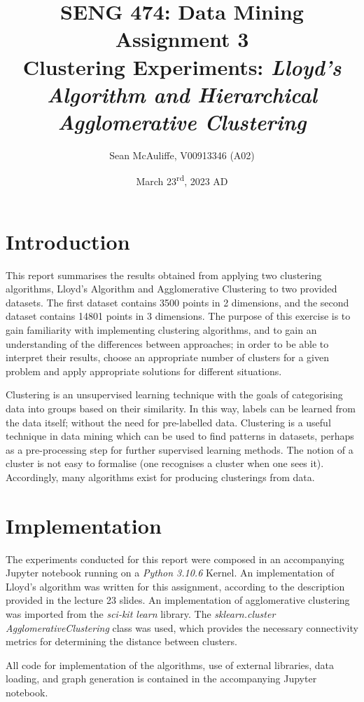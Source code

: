 \documentclass[12pt]{article}
\title{\textbf{SENG 474: Data Mining \\Assignment 3} \\[2ex]
\large Clustering Experiments: 
\large \textit{Lloyd's Algorithm and Hierarchical Agglomerative Clustering}}
\author{Sean McAuliffe, V00913346 (A02)}
\date{March 23\textsuperscript{rd}, 2023 AD}
\begin{document}
\maketitle

\pagebreak
\tableofcontents  
\pagebreak

\section{Introduction}

This report summarises the results obtained from applying two 
clustering algorithms, Lloyd's Algorithm and Agglomerative Clustering to two
provided datasets. The first dataset contains 3500 points in 2 dimensions, and
the second dataset contains 14801 points in 3 dimensions. The purpose of this
exercise is to gain familiarity with implementing clustering algorithms, and to
gain an understanding of the differences between approaches; in order to be
able to interpret their results, choose an appropriate number of clusters for
a given problem and apply appropriate solutions for different situations.

Clustering is an unsupervised learning technique with the goals of
categorising data into groups based on their similarity. In this way, labels 
can be learned from the data itself; without the need for pre-labelled data.
Clustering is a useful technique in data mining which can be used to find 
patterns in datasets, perhaps as a pre-processing step for further supervised
learning methods. The notion of a cluster is not easy to formalise (one 
recognises a cluster when one sees it). Accordingly, many algorithms exist for
producing clusterings from data.

\section{Implementation}

The experiments conducted for this report were composed in an accompanying
Jupyter notebook running on a \emph{Python 3.10.6} Kernel. An implementation of
Lloyd's algorithm was written for this assignment, according to the description
provided in the lecture 23 slides. An implementation of agglomerative clustering
was imported from the \emph{sci-kit learn} library. The
\emph{sklearn.cluster AgglomerativeClustering} class was used, which provides
the necessary connectivity metrics for determining the distance between
clusters. 

All code for implementation of the algorithms, use of external libraries, data
loading, and graph generation is contained in the accompanying Jupyter notebook.
\end{document}
